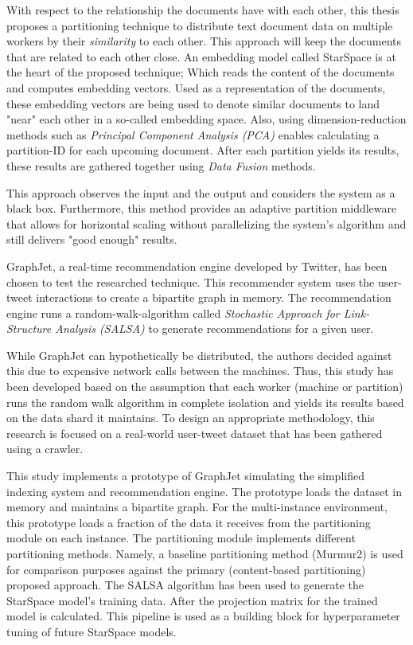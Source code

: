 With respect to the relationship the documents have with each other, this thesis proposes a partitioning technique to distribute text document data on multiple workers by their \emph{similarity} to each other. This approach will keep the documents that are related to each other close. An embedding model called StarSpace is at the heart of the proposed technique; Which reads the content of the documents and computes embedding vectors. Used as a representation of the documents, these embedding vectors are being used to denote similar documents to land "near" each other in a so-called embedding space. Also, using dimension-reduction methods such as \emph{Principal Component Analysis (PCA)} enables calculating a partition-ID for each upcoming document. After each partition yields its results, these results are gathered together using \emph{Data Fusion} methods. 


This approach observes the input and the output and considers the system as a black box. Furthermore, this method provides an adaptive partition middleware that allows for horizontal scaling without parallelizing the system's algorithm and still delivers "good enough" results.


GraphJet, a real-time recommendation engine developed by Twitter, has been chosen to test the researched technique. This recommender system uses the user-tweet interactions to create a bipartite graph in memory. The recommendation engine runs a random-walk-algorithm called \emph{Stochastic Approach for Link-Structure Analysis (SALSA)} to generate recommendations for a given user. 


While GraphJet can hypothetically be distributed, the authors decided against this due to expensive network calls between the machines. Thus, this study has been developed based on the assumption that each worker (machine or partition) runs the random walk algorithm in complete isolation and yields its results based on the data shard it maintains. To design an appropriate methodology, this research is focused on a real-world user-tweet dataset that has been gathered using a crawler. 


This study implements a prototype of GraphJet simulating the simplified indexing system and recommendation engine. The prototype loads the dataset in memory and maintains a bipartite graph. For the multi-instance environment, this prototype loads a fraction of the data it receives from the partitioning module on each instance. The partitioning module implements different partitioning methods. Namely, a baseline partitioning method (Murmur2) is used for comparison purposes against the primary (content-based partitioning) proposed approach. The SALSA algorithm has been used to generate the StarSpace model's training data. After the projection matrix for the trained model is calculated. This pipeline is used as a building block for hyperparameter tuning of future StarSpace models.


